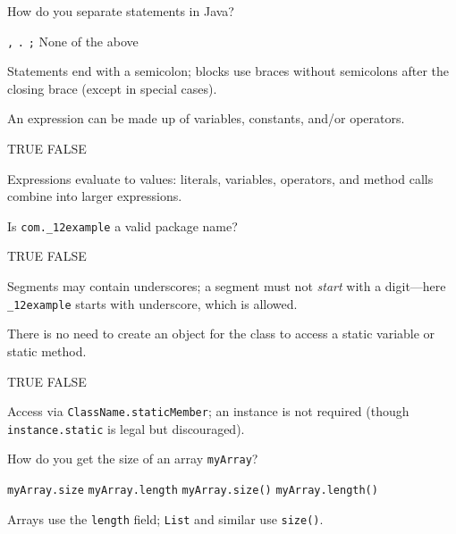 \question[4]
How do you separate statements in Java?
\begin{choices}
  \choice \lstinline!,!
  \choice \lstinline!.!
  \CorrectChoice \lstinline!;!
  \choice None of the above
\end{choices}
\begin{solution}
  Statements end with a semicolon; blocks use braces without semicolons after the closing brace (except in special cases).
\end{solution}

\question[4]
An expression can be made up of variables, constants, and/or operators.
\begin{choices}
  \CorrectChoice TRUE
  \choice FALSE
\end{choices}
\begin{solution}
  Expressions evaluate to values: literals, variables, operators, and method calls combine into larger expressions.
\end{solution}

\question[4]
Is \lstinline!com._12example! a valid package name?
\begin{choices}
  \CorrectChoice TRUE
  \choice FALSE
\end{choices}
\begin{solution}
  Segments may contain underscores; a segment must not \emph{start} with a digit---here \texttt{\_12example} starts with underscore, which is allowed.
\end{solution}

\question[4]
There is no need to create an object for the class to access a static variable or static method.
\begin{choices}
  \CorrectChoice TRUE
  \choice FALSE
\end{choices}
\begin{solution}
  Access via \texttt{ClassName.staticMember}; an instance is not required (though \texttt{instance.static} is legal but discouraged).
\end{solution}

\question[4]
How do you get the size of an array \lstinline!myArray!?
\begin{choices}
  \choice \lstinline!myArray.size!
  \CorrectChoice \lstinline!myArray.length!
  \choice \lstinline!myArray.size()!
  \choice \lstinline!myArray.length()!
\end{choices}
\begin{solution}
  Arrays use the \texttt{length} field; \texttt{List} and similar use \texttt{size()}.
\end{solution}

